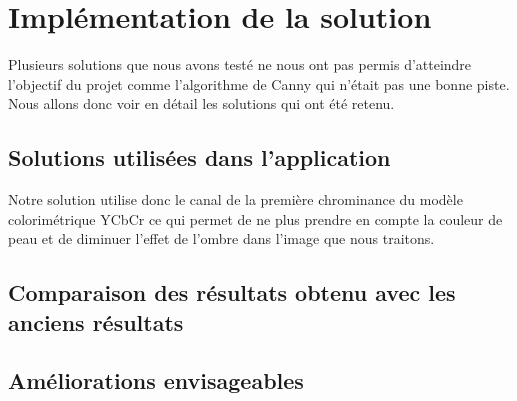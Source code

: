 \section{Implémentation de la solution}
Plusieurs solutions que nous avons testé ne nous ont pas permis d'atteindre l'objectif du projet comme 
l'algorithme de Canny qui n'était pas une bonne piste. Nous allons donc voir en détail les solutions qui ont
été retenu.

\subsection{Solutions utilisées dans l'application}
Notre solution utilise donc le canal de la première chrominance du modèle colorimétrique YCbCr ce qui permet 
de ne plus prendre en compte la couleur de peau et de diminuer l'effet de l'ombre dans l'image que nous traitons.

\subsection{Comparaison des résultats obtenu avec les anciens résultats}

\subsection{Améliorations envisageables}
